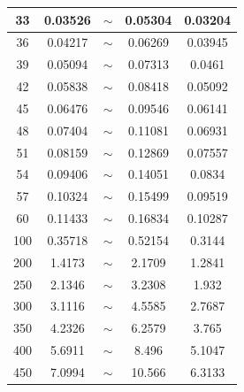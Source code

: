 \begin{table}[!ht]
\begin{tabular}{|c|c|c|c|c|}
		33   & 0.03526            & $\sim$                & 0.05304                     & 0.03204                \\ \hline
		36   & 0.04217            & $\sim$                & 0.06269                     & 0.03945                \\ \hline
		39   & 0.05094            & $\sim$                & 0.07313                     & 0.0461                 \\ \hline
		42   & 0.05838            & $\sim$                & 0.08418                     & 0.05092                \\ \hline
		45   & 0.06476            & $\sim$                & 0.09546                     & 0.06141                \\ \hline
		48   & 0.07404            & $\sim$                & 0.11081                     & 0.06931                \\ \hline
		51   & 0.08159            & $\sim$                & 0.12869                     & 0.07557                \\ \hline
		54   & 0.09406            & $\sim$                & 0.14051                     & 0.0834                 \\ \hline
		57   & 0.10324            & $\sim$                & 0.15499                     & 0.09519                \\ \hline
		60   & 0.11433            & $\sim$                & 0.16834                     & 0.10287                \\ \hline
		100  & 0.35718            & $\sim$                & 0.52154                     & 0.3144                 \\ \hline
		200  & 1.4173             & $\sim$                & 2.1709                      & 1.2841                 \\ \hline
		250  & 2.1346             & $\sim$                &  3.2308                      & 1.932                  \\ \hline
		300  & 3.1116             & $\sim$                & 4.5585                      & 2.7687                 \\ \hline
		350  & 4.2326             & $\sim$                & 6.2579                      & 3.765                  \\ \hline
		400  & 5.6911             & $\sim$                & 8.496                       & 5.1047                 \\ \hline
		450  & 7.0994             & $\sim$                & 10.566                      & 6.3133                 \\ \hline

\end{tabular}
\end{table}

